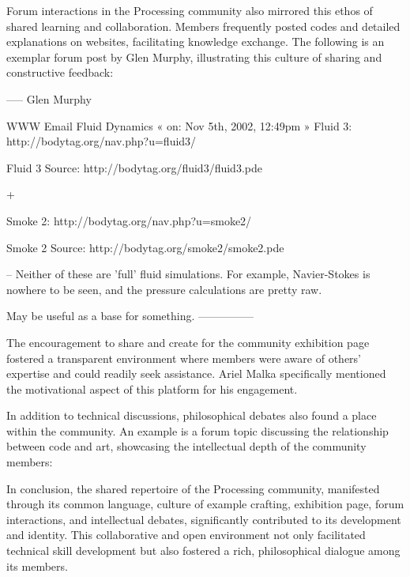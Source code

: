 Forum interactions in the Processing community also mirrored this ethos of shared learning and collaboration. Members frequently posted codes and detailed explanations on websites, facilitating knowledge exchange. The following is an exemplar forum post by Glen Murphy, illustrating this culture of sharing and constructive feedback:

-----
Glen Murphy

WWW Email
Fluid Dynamics
« on: Nov 5th, 2002, 12:49pm »	
Fluid 3: http://bodytag.org/nav.php?u=fluid3/
 
Fluid 3 Source: http://bodytag.org/fluid3/fluid3.pde
 
+
 
Smoke 2: http://bodytag.org/nav.php?u=smoke2/
 
Smoke 2 Source: http://bodytag.org/smoke2/smoke2.pde
 
--
Neither of these are 'full' fluid simulations. For example, Navier-Stokes is nowhere to be seen, and the pressure calculations are pretty raw.
 
May be useful as a base for something.
---------------


The encouragement to share and create for the community exhibition page fostered a transparent environment where members were aware of others' expertise and could readily seek assistance. Ariel Malka specifically mentioned the motivational aspect of this platform for his engagement.

In addition to technical discussions, philosophical debates also found a place within the community. An example is a forum topic discussing the relationship between code and art, showcasing the intellectual depth of the community members:



In conclusion, the shared repertoire of the Processing community, manifested through its common language, culture of example crafting, exhibition page, forum interactions, and intellectual debates, significantly contributed to its development and identity. This collaborative and open environment not only facilitated technical skill development but also fostered a rich, philosophical dialogue among its members.

